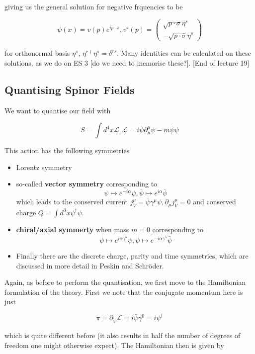 \documentclass{article}
\theoremstyle{definition}
\begin{document}
giving us the general solution for negative frquencies to be

$$ \psi(x) = v(p) e^{i p \cdot x}, v^s(p) =
\begin{pmatrix}
  \sqrt{p \cdot \sigma} \eta^s \\
  -\sqrt{p \cdot \bar{\sigma}} \eta^s
\end{pmatrix} $$

for orthonormal basis $\eta^s$, $\eta^{r\dagger}\eta^s = \delta^{rs}$. Many
identities can be calculated on these solutions, as we do on ES 3 [do we need to
memorise these?]. [End of lecture 19]

\subsection{Quantising Spinor Fields}

We want to quantise our field  with

$$ S = \int d^4 x \mathcal{L}, \mathcal{L} = i \bar{\psi} \partial^\mu_\mu \psi
- m \bar{\psi} \psi $$

This action has the following symmetries

\begin{itemize}
\item Lorentz symmetry
\item so-called \textbf{vector symmetry} corresponding to
  $$ \psi \mapsto e^{-i \alpha} \psi, \bar{\psi} \mapsto e^{i \alpha}
  \bar{\psi} $$
  which leads to the conserved current $j^\mu_V = \bar{\psi} \gamma^\mu \psi,
  \partial_\mu j^\mu_V = 0$ and conserved charge $Q = \int d^3x \psi^\dagger
  \psi$.
\item \textbf{chiral/axial symmerty} when mass $m=0$ corresponding to
  $$ \psi \mapsto e^{i \alpha \gamma^5} \psi, \bar{\psi \mapsto e^{-i \alpha
      \gamma^5}} \bar{\psi} $$
\item Finally there are the discrete charge, parity and time symmetries, which
  are discussed in more detail in Peskin and Schr\"{o}der.
\end{itemize}

Again, as before to perform the quantisation, we first move to the Hamiltonian
formulation of the theory. First we note that the conjugate momentum here is
just

$$ \pi = \partial_{\dot{\psi}} \mathcal{L} = i\bar{\psi} \gamma^0 = i
\psi^\dagger $$

which is quite different before (it also results in half the number of degrees
of freedom one might otherwise expect). The Hamiltonian then is given by
\end{document}
